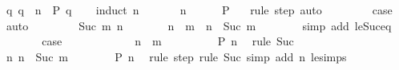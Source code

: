 \begin{isabellebody}
\ {\isachardoublequoteopen}{\isasymAnd}q{\isachardot}{\kern0pt}\ q\ {\isasymle}\ n\ {\isasymLongrightarrow}\ P\ q{\isachardoublequoteclose}\isanewline
\ \ \isamarkupfalse%
\ {\isacharparenleft}{\kern0pt}induct\ n{\isacharparenright}{\kern0pt}\isanewline
\ \ \ \ \isamarkupfalse%
\ {\isacharparenleft}{\kern0pt}{}\ n{\isacharparenright}{\kern0pt}\isanewline
\ \ \ \ \isamarkupfalse%
\ {\isachardoublequoteopen}P\ {}{\isachardoublequoteclose}\ \isamarkupfalse%
\ {\isacharparenleft}{\kern0pt}rule\ step{\isacharparenright}{\kern0pt}\ auto\isanewline
\ \ \ \ \isamarkupfalse%
\ {}\ \isamarkupfalse%
\ {\isacharquery}{\kern0pt}case\ \isamarkupfalse%
\ auto\isanewline
\ \ \isamarkupfalse%
\isanewline
\ \ \ \ \isamarkupfalse%
\ {\isacharparenleft}{\kern0pt}Suc\ m\ n{\isacharparenright}{\kern0pt}\isanewline
\ \ \ \ \isamarkupfalse%
\ \isamarkupfalse%
\ {\isachardoublequoteopen}n\ {\isasymle}\ m\ {\isasymor}\ n\ {\isacharequal}{\kern0pt}\ Suc\ m{\isachardoublequoteclose}\isanewline
\ \ \ \ \ \ \isamarkupfalse%
\ {\isacharparenleft}{\kern0pt}simp\ add{\isacharcolon}{\kern0pt}\ le{\isacharunderscore}{\kern0pt}Suc{\isacharunderscore}{\kern0pt}eq{\isacharparenright}{\kern0pt}\isanewline
\ \ \ \ \isamarkupfalse%
\ \isamarkupfalse%
\ {\isacharquery}{\kern0pt}case\isanewline
\ \ \ \ \isamarkupfalse%
\isanewline
\ \ \ \ \ \ \isamarkupfalse%
\ {\isachardoublequoteopen}n\ {\isasymle}\ m{\isachardoublequoteclose}\isanewline
\ \ \ \ \ \ \isamarkupfalse%
\ \isamarkupfalse%
\ {\isachardoublequoteopen}P\ n{\isachardoublequoteclose}\ \isamarkupfalse%
\ {\isacharparenleft}{\kern0pt}rule\ Suc{\isacharparenleft}{\kern0pt}{}{\isacharparenright}{\kern0pt}{\isacharparenright}{\kern0pt}\isanewline
\ \ \ \ \isamarkupfalse%
\isanewline
\ \ \ \ \ \ \isamarkupfalse%
\ n{\isacharcolon}{\kern0pt}\ {\isachardoublequoteopen}n\ {\isacharequal}{\kern0pt}\ Suc\ m{\isachardoublequoteclose}\isanewline
\ \ \ \ \ \ \isamarkupfalse%
\ {\isachardoublequoteopen}P\ n{\isachardoublequoteclose}\ \isamarkupfalse%
\ {\isacharparenleft}{\kern0pt}rule\ step{\isacharparenright}{\kern0pt}\ {\isacharparenleft}{\kern0pt}rule\ Suc{\isacharparenleft}{\kern0pt}{}{\isacharparenright}{\kern0pt}{\isacharcomma}{\kern0pt}\ simp\ add{\isacharcolon}{\kern0pt}\ n\ le{\isacharunderscore}{\kern0pt}simps{\isacharparenright}{\kern0pt}\isanewline

\end{isabellebody}
